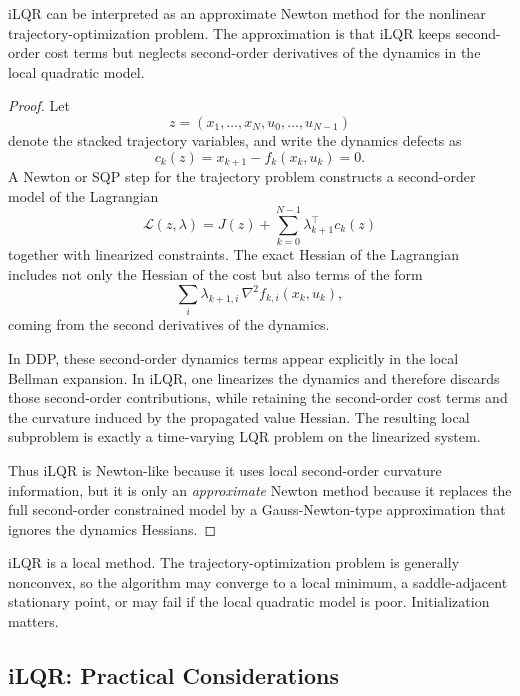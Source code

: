 \begin{proposition}\label{prop:l8-ilqr-as-approximate-newton-on-trajectory-space}
	iLQR can be interpreted as an approximate Newton method for the nonlinear trajectory-optimization problem. The approximation is that iLQR keeps second-order cost terms but neglects second-order derivatives of the dynamics in the local quadratic model.
\end{proposition}
\begin{proof}
	Let
	\[
		z = (x_1,\dots,x_N,u_0,\dots,u_{N-1})
	\]
	denote the stacked trajectory variables, and write the dynamics defects as
	\[
		c_k(z)=x_{k+1}-f_k(x_k,u_k)=0.
	\]
	A Newton or SQP step for the trajectory problem constructs a second-order model of the Lagrangian
	\[
		\mathcal{L}(z,\lambda)=J(z)+\sum_{k=0}^{N-1}\lambda_{k+1}^\top c_k(z)
	\]
	together with linearized constraints. The exact Hessian of the Lagrangian includes not only the Hessian of the cost but also terms of the form
	\[
		\sum_i \lambda_{k+1,i}\,\nabla^2 f_{k,i}(x_k,u_k),
	\]
	coming from the second derivatives of the dynamics.

	In DDP, these second-order dynamics terms appear explicitly in the local Bellman expansion. In iLQR, one linearizes the dynamics and therefore discards those second-order contributions, while retaining the second-order cost terms and the curvature induced by the propagated value Hessian. The resulting local subproblem is exactly a time-varying LQR problem on the linearized system.

	Thus iLQR is Newton-like because it uses local second-order curvature information, but it is only an \emph{approximate} Newton method because it replaces the full second-order constrained model by a Gauss-Newton-type approximation that ignores the dynamics Hessians.
\end{proof}

\begin{remark}
	iLQR is a local method. The trajectory-optimization problem is generally nonconvex, so the algorithm may converge to a local minimum, a saddle-adjacent stationary point, or may fail if the local quadratic model is poor. Initialization matters.
\end{remark}

\subsection{iLQR: Practical Considerations}
\label{sec:l8-ilqr-practical-considerations}

